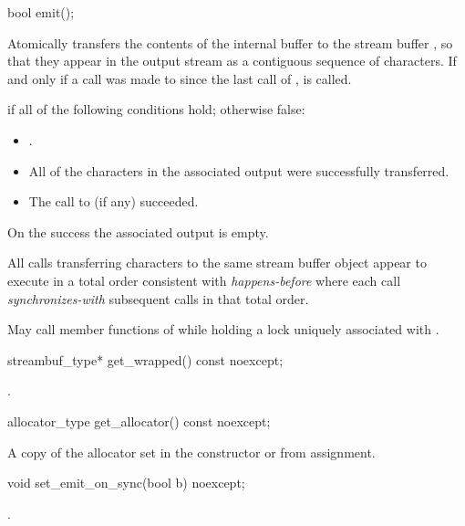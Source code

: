\documentclass[ebook,11pt,article]{memoir}
\begin{document}

\begin{addedblock}
\begin{itemdecl}
bool emit();
\end{itemdecl}

\begin{itemdescr}
\pnum
\effects 
Atomically transfers the contents of the internal buffer to the stream buffer , so that they appear in the output stream as a contiguous sequence of characters. If and only if a call was made to  since the last call of ,   is called.

\pnum
\returns {} if all of the following conditions hold; otherwise false:
\begin{itemize}
\item {}.
\item All of the characters in the associated output were successfully transferred.
\item The call to  (if any) succeeded.
\end{itemize}

\pnum
\postconditions
On the success the associated output is empty.

\pnum
{}
All  calls transferring characters to the same stream buffer object appear to execute in a total order consistent with \emph{happens-before} where each  call \emph{synchronizes-with} subsequent  calls in that total order.


\pnum
\remarks
May call member functions of  while holding a lock uniquely associated with .
\end{itemdescr}

\begin{itemdecl}
streambuf_type* get_wrapped() const noexcept;
\end{itemdecl}

\begin{itemdescr}
\pnum
\returns 
{}.
\end{itemdescr}

\begin{itemdecl}
allocator_type get_allocator() const noexcept;
\end{itemdecl}

\begin{itemdescr}
\pnum
\returns 
A copy of the allocator set in the constructor or from assignment.
\end{itemdescr}

\begin{itemdecl}
void set_emit_on_sync(bool b) noexcept;
\end{itemdecl}

\begin{itemdescr}
\pnum
\effects 
{}.
\end{itemdescr}

\end{addedblock}
\end{document}
